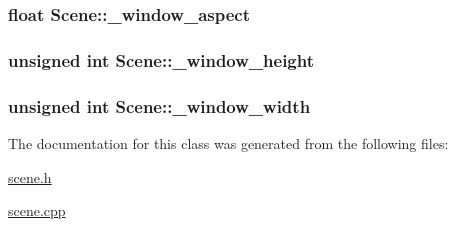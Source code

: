 \hypertarget{class_scene_aa5d5f322f50e6518e88501fa5481eca9}{
\subsubsection[{\+\_\+window\+\_\+aspect}]{\setlength{\rightskip}{0pt plus 5cm}float Scene\+::\+\_\+window\+\_\+aspect}}\label{class_scene_aa5d5f322f50e6518e88501fa5481eca9}
\hypertarget{class_scene_a4a9a7b4b69981efd9ffddfb7d4205806}{
\subsubsection[{\+\_\+window\+\_\+height}]{\setlength{\rightskip}{0pt plus 5cm}unsigned int Scene\+::\+\_\+window\+\_\+height}}\label{class_scene_a4a9a7b4b69981efd9ffddfb7d4205806}
\hypertarget{class_scene_a9857688fb9c3a52be5e6b7551d7e3af8}{
\subsubsection[{\+\_\+window\+\_\+width}]{\setlength{\rightskip}{0pt plus 5cm}unsigned int Scene\+::\+\_\+window\+\_\+width}}\label{class_scene_a9857688fb9c3a52be5e6b7551d7e3af8}


The documentation for this class was generated from the following files\+:\begin{DoxyCompactItemize}
\item 
\hyperlink{scene_8h}{scene.\+h}\item 
\hyperlink{scene_8cpp}{scene.\+cpp}\end{DoxyCompactItemize}
